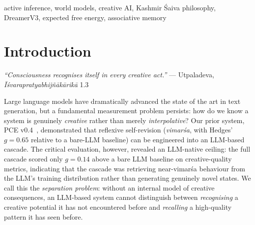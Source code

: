 \documentclass[journal,onecolumn,11pt]{IEEEtran}
\begin{document}
\begin{abstract}
three seeds),
H8 (encoder norm $13.20 \in [1.0, 50.0]$),
and H9 (effective action diversity $0.582$ nats $> 0.5$ nat threshold).
H5b is a documented honest negative result: against a 120B unconditioned
LLM that is near-ceiling on English-script domains, PWM-conditioned
generation scores $\mu_{\text{PWM}} = 0.788$ versus
$\mu_{\text{LLM}} = 0.862$ on the live text-only camatkāra scorer (Hedges'
$g = -0.47$, BCa $95\%$ CI $[-0.12, -0.02]$, paired permutation
$p = 0.996$, $n = 30$ across three domains), with near-parity on the
lower-resource Kannada film domain.
Phase~7 resolves a separate production-UX contradiction (time-to-first-token
versus 120B quality) using a TRIZ-guided architecture: a fast 4-billion
parameter model cascade-streams the first tokens in under $5$\,s while a
WMReasoningTrace think-block prefill collapses 120B chain-of-thought
latency from approximately $60$\,s to approximately $3$\,s by serialising
the world model's vimarśa state directly as the LLM's pre-completed
reasoning ($118/118$ Sprint tests pass; switch latency falls from
approximately $65$\,s to approximately $5$\,s).
We release all code, configurations, trained checkpoints for all seven
phases, and the $4.6$-million-token multilingual creative corpus at
\url{https://github.com/SharathSPhD/pratyabhijna-world-model}.
\end{abstract}

\begin{IEEEkeywords}
active inference, world models, creative AI, Kashmir Śaiva philosophy,
DreamerV3, expected free energy, associative memory
\end{IEEEkeywords}

\section{Introduction}\label{sec:intro}

\noindent\textit{``Consciousness recognises itself in every creative act.''}
\hfill --- Utpaladeva, \emph{Īśvarapratyabhijñākārikā} 1.3~\cite{utpaladeva1994isvara,torella1994isvara}
\vspace{0.5em}

Large language models have dramatically advanced the state of the art
in text generation, but a fundamental measurement problem persists:
how do we know a system is genuinely \emph{creative} rather than merely
\emph{interpolative}?
Our prior system, PCE v0.4~\cite{pce2024}, demonstrated that reflexive
self-revision (\emph{vimarśa}, with Hedges' $g{=}0.65$ relative to a
bare-LLM baseline) can be engineered into an LLM-based cascade.
The critical evaluation, however, revealed an LLM-native ceiling: the full
cascade scored only $g{=}0.14$ above a bare LLM baseline on creative-quality
metrics, indicating that the cascade was retrieving near-vimarśa behaviour
from the LLM's training distribution rather than generating genuinely novel
states.
We call this the \emph{separation problem}: without an internal model of
creative consequences, an LLM-based system cannot distinguish between
\emph{recognising} a creative potential it has not encountered before and
\emph{recalling} a high-quality pattern it has seen before.
\end{document}
